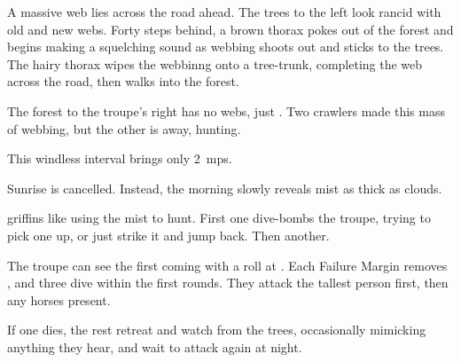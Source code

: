 \begin{boxtext}
  A massive web lies across the road ahead.
  The trees to the left look rancid with old and new webs.
  Forty \glspl{step} behind, a brown thorax pokes out of the forest and begins making a squelching sound as webbing shoots out and sticks to the trees.
  The hairy thorax wipes the webbinng onto a tree-trunk, completing the web across the road, then walks into the forest.
\end{boxtext}

The forest to the troupe's right has no webs, just .
Two \glspl{crawler} made this mass of webbing, but the other is away, hunting.

This windless \gls{interval} brings only 2~\glspl{mp}.

\else%


\begin{boxtext}
  Sunrise is cancelled.
  Instead, the morning slowly reveals mist as thick as clouds.
\end{boxtext}

\Glspl{griffin} like using the mist to hunt.
First one dive-bombs the troupe, trying to pick one up, or just strike it and jump back.
Then another.

\griffin

The troupe can see the first coming with a  roll at \tn[12].
Each Failure Margin removes , and three dive within the first \glspl{round}.
They attack the tallest person first, then any horses present.

If one dies, the rest retreat and watch from the trees, occasionally mimicking anything they hear, and wait to attack again at night.

\fi
